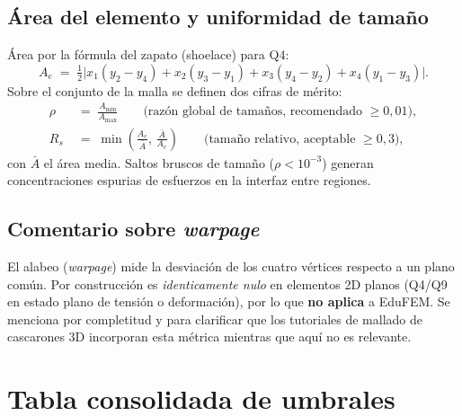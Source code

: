 \documentclass[11pt,a4paper]{article}
\begin{document}
\subsection{\'Area del elemento y uniformidad de tama\~no}

\'Area por la f\'ormula del zapato (shoelace) para Q4:
\begin{equation}
A_e \;=\; \tfrac{1}{2}\bigl|x_1(y_2-y_4)+x_2(y_3-y_1)+x_3(y_4-y_2)+x_4(y_1-y_3)\bigr|.
\label{eq:area}
\end{equation}
Sobre el conjunto de la malla se definen dos cifras de m\'erito:
\begin{align}
\rho &\;=\; \frac{A_{\min}}{A_{\max}} \qquad \text{(raz\'on global de tama\~nos, recomendado } \ge 0{,}01\text{)}, \\
R_s &\;=\; \min\!\left(\frac{A_e}{\bar A},\,\frac{\bar A}{A_e}\right) \qquad \text{(tama\~no relativo, aceptable } \ge 0{,}3\text{)},
\end{align}
con $\bar A$ el \'area media. Saltos bruscos de tama\~no ($\rho<10^{-3}$) generan concentraciones espurias de esfuerzos en la interfaz entre regiones.

\subsection{Comentario sobre \emph{warpage}}
El alabeo (\emph{warpage}) mide la desviaci\'on de los cuatro v\'ertices respecto a un plano com\'un. Por construcci\'on es \emph{identicamente nulo} en elementos 2D planos (Q4/Q9 en estado plano de tensi\'on o deformaci\'on), por lo que \textbf{no aplica} a EduFEM. Se menciona por completitud y para clarificar que los tutoriales de mallado de cascarones 3D incorporan esta m\'etrica mientras que aqu\'i no es relevante.

\section{Tabla consolidada de umbrales}
\end{document}
